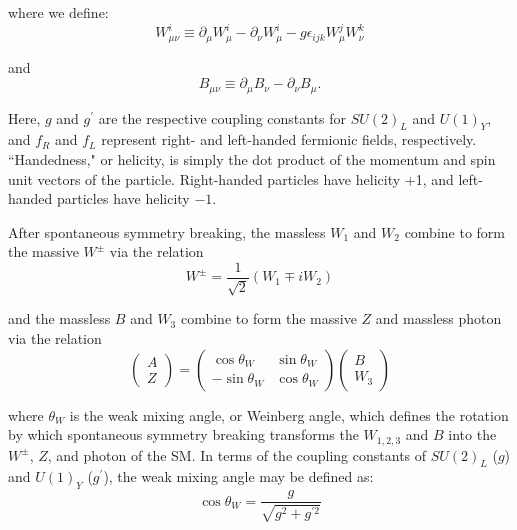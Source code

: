 \noindent where we define:
\begin{equation}
W^{i}_{\mu\nu} \equiv \partial_{\mu}W^{i}_{\mu} - \partial_{\nu}W^{i}_{\mu} - g\epsilon_{ijk}W^{j}_{\mu}W^{k}_{\nu}
\end{equation}

\noindent and
\begin{equation}
B_{\mu\nu} \equiv \partial_{\mu}B_{\nu} - \partial_{\nu}B_{\mu}.
\end{equation}

Here, $g$ and $g^{\prime}$ are the respective coupling constants for $SU(2)_{L}$ and $U(1)_{Y}$, and $f_{R}$ and $f_{L}$ represent right- and left-handed fermionic fields, respectively. ``Handedness," or helicity, is simply the dot product of the momentum and spin unit vectors of the particle. Right-handed particles have helicity +1, and left-handed particles have helicity $-1$.

After spontaneous symmetry breaking, the massless $W_{1}$ and $W_{2}$ combine to form the massive $W^{\pm}$ via the relation
\begin{equation}
W^{\pm} = \frac{1}{\sqrt{2}}\left(W_{1} \mp iW_{2}\right)
\end{equation}

\noindent and the massless $B$ and $W_{3}$ combine to form the massive $Z$ and massless photon via the relation
\begin{equation}
\begin{pmatrix}A \\Z\end{pmatrix}=\begin{pmatrix}\cos \theta _{W}&\sin \theta _{W}\\-\sin \theta _{W}&\cos \theta _{W}\end{pmatrix}\begin{pmatrix}B\\W_{3}\end{pmatrix}
\end{equation}

\noindent where $\theta_{W}$ is the weak mixing angle, or Weinberg angle, which defines the rotation by which spontaneous symmetry breaking transforms the $W_{1,2,3}$ and $B$ into the $W^{\pm}$, $Z$, and photon of the SM. In terms of the coupling constants of $SU(2)_{L}$ ($g$) and $U(1)_{Y}$ ($g^\prime$), the weak mixing angle may be defined as\cite{srednicki}:
\begin{equation}
\cos \theta_{W} = \frac{g}{\sqrt{g^{2} + g^{\prime2}}}
\end{equation}

